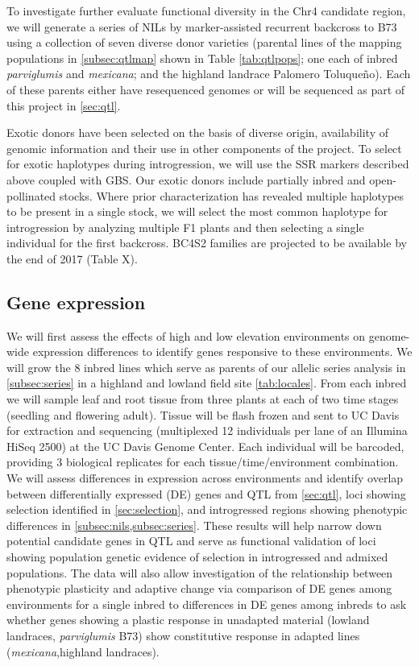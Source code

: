 To investigate further evaluate functional diversity in the Chr4 candidate region, we will generate a series of NILs by marker-assisted recurrent backcross to B73 using a collection of seven diverse donor varieties (parental lines of the mapping populations in \ref{subsec:qtlmap} shown in Table \ref{tab:qtlpops}; one each of inbred \emph{parviglumis} and \emph{mexicana}; and the highland landrace Palomero Toluque\~no). Each of these parents either have resequenced genomes \citep{Vielle-Calzada2009, Chia2012a} or will be sequenced as part of this project in  \ref{sec:qtl}.

Exotic donors have been selected on the basis of diverse origin, availability of genomic information and their use in other components of the project. To select for exotic haplotypes during introgression, we will use the SSR markers described above coupled with GBS. Our exotic donors include partially inbred and open-pollinated stocks. Where prior characterization has revealed multiple haplotypes to be present in a single stock, we will select the most common haplotype for introgression by analyzing multiple F1 plants and then selecting a single individual for the first backcross. BC4S2 families are projected to be available by the end of 2017 (Table X). 

\subsection{Gene expression} \label{subsec:rnaseq}

We will first assess the effects of high and low elevation environments on genome-wide expression differences to identify genes responsive to these environments.  We will grow the 8 inbred lines which serve as parents of our allelic series analysis in \ref{subsec:series} in a highland and lowland field site \ref{tab:locales}.  From each inbred we will sample leaf and root tissue from three plants at each of two time stages (seedling and flowering adult). Tissue will be flash frozen and sent to UC Davis for extraction and sequencing (multiplexed 12 individuals per lane of an Illumina HiSeq 2500) at the UC Davis Genome Center. Each individual will be barcoded, providing 3 biological replicates for each tissue/time/environment combination. We will assess differences in expression across environments and identify overlap between differentially expressed (DE) genes and QTL from \ref{sec:qtl}, loci showing selection identified in \ref{sec:selection}, and introgressed regions showing phenotypic differences in \ref{subsec:nils,subsec:series}.   These results will help narrow down potential candidate genes in QTL and serve as functional validation of loci showing population genetic evidence of selection in introgressed and admixed populations.  The data will also allow investigation of the relationship between phenotypic plasticity and adaptive change \citep[c.f.][]{Rosas26082013} via comparison of DE genes among environments for a single inbred to differences in DE genes among inbreds to ask whether genes showing a plastic response in unadapted material (lowland landraces, \emph{parviglumis} B73) show constitutive response in adapted lines (\emph{mexicana},highland landraces).  

